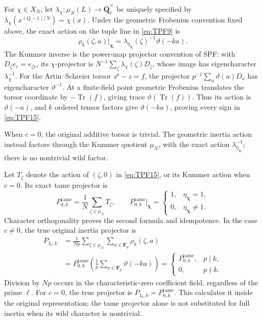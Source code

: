 For \(\chi\in X_N\), let
\(\lambda_\chi:\mu_N(L)\to\overline{\mathbf Q}_\ell^\times\)
be uniquely specified by
\(\lambda_\chi(x^{(Q-1)/N})=\chi(x)\).
Under the geometric Frobenius convention fixed above, the
exact action on the tuple line in \eqref{eq:TPF9} is
\[
 \rho_k(\zeta,a)\big|_{\boldsymbol\chi}
    =\lambda_{\eta_{\boldsymbol\chi}}(\zeta)^{-1}
                         \vartheta(-ka).
 \tag{TPF.15}\label{eq:TPF15}
\]
The Kummer inverse is the power-map projector convention
of SPF: with \(D_\zeta e_r=e_{\zeta r}\), its
\(\chi\)-projector is
\(N^{-1}\sum_\zeta\lambda_\chi(\zeta)D_\zeta\), whose
image has eigencharacter \(\lambda_\chi^{-1}\).
For the Artin--Schreier torsor \(z^p-z=f\), the
projector \(p^{-1}\sum_a\vartheta(a)D_a\) has
eigencharacter \(\vartheta^{-1}\).
At a finite-field point geometric Frobenius translates
the torsor coordinate by
\(-\operatorname{Tr}(f)\), giving trace
\(\vartheta(\operatorname{Tr}(f))\).
Thus its action is \(\vartheta(-a)\), and \(k\) ordered
tensor factors give \(\vartheta(-ka)\), proving every
sign in \eqref{eq:TPF15}.

When \(c=0\), the original additive torsor is trivial.
The geometric inertia action instead factors through
the Kummer quotient \(\mu_N\), with the exact action
\(\lambda_{\eta_{\boldsymbol\chi}}^{-1}\); there is no
nontrivial wild factor.

Let \(T_\zeta\) denote the action of \((\zeta,0)\) in
\eqref{eq:TPF15}, or its Kummer action when \(c=0\).
Its exact tame projector is
\[
 P^{\mathrm{tame}}_{0,k}=\frac1N\sum_{\zeta\in\mu_N}T_\zeta,
 \qquad
 P^{\mathrm{tame}}_{0,k}\big|_{\boldsymbol\chi}
   =\begin{cases}
     1,&\eta_{\boldsymbol\chi}=1,\\
     0,&\eta_{\boldsymbol\chi}\ne1 .
    \end{cases}
 \tag{TPF.16}\label{eq:TPF16}
\]
Character orthogonality proves the second formula and
idempotence. In the case \(c\ne0\), the true original
inertia projector is
\[
 \begin{split}
 P_{I_0,k}
 &=\frac1{Np}\sum_{\zeta\in\mu_N}\sum_{a\in\mathbf F_p}
                         \rho_k(\zeta,a)\\
 &=P^{\mathrm{tame}}_{0,k}
                \left(\frac1p\sum_{a\in\mathbf F_p}
                                      \vartheta(-ka)\right)
 =\begin{cases}
    P^{\mathrm{tame}}_{0,k},&p\mid k,\\
    0,&p\nmid k .
   \end{cases}
 \end{split}
 \tag{TPF.17}\label{eq:TPF17}
\]
Division by \(Np\) occurs in the characteristic-zero
coefficient field, regardless of the prime \(\ell\).
For \(c=0\), the true projector is
\(P_{I_0,k}=P^{\mathrm{tame}}_{0,k}\).
This calculates it inside the original representation;
the tame projector alone is not substituted for full
inertia when its wild character is nontrivial.


